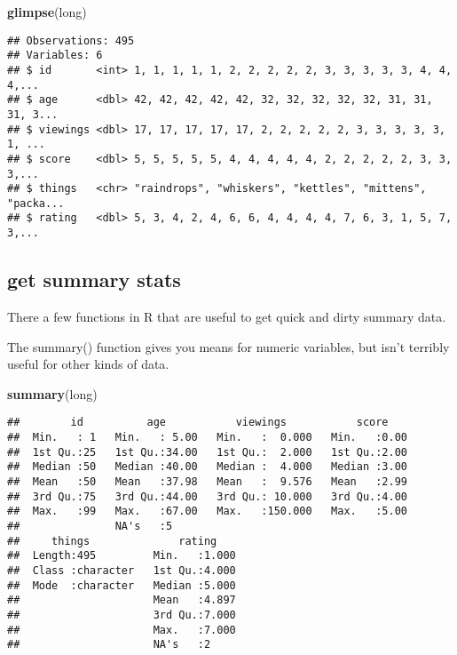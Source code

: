 \documentclass[]{article}
\newenvironment{Shaded}{\begin{snugshade}}{\end{snugshade}}
\newcommand{\KeywordTok}[1]{\textcolor[rgb]{0.13,0.29,0.53}{\textbf{#1}}}
\newcommand{\NormalTok}[1]{#1}
\begin{document}
\begin{Shaded}
\begin{Highlighting}[]
\KeywordTok{glimpse}\NormalTok{(long)}
\end{Highlighting}
\end{Shaded}

\begin{verbatim}
## Observations: 495
## Variables: 6
## $ id       <int> 1, 1, 1, 1, 1, 2, 2, 2, 2, 2, 3, 3, 3, 3, 3, 4, 4, 4,...
## $ age      <dbl> 42, 42, 42, 42, 42, 32, 32, 32, 32, 32, 31, 31, 31, 3...
## $ viewings <dbl> 17, 17, 17, 17, 17, 2, 2, 2, 2, 2, 3, 3, 3, 3, 3, 1, ...
## $ score    <dbl> 5, 5, 5, 5, 5, 4, 4, 4, 4, 4, 2, 2, 2, 2, 2, 3, 3, 3,...
## $ things   <chr> "raindrops", "whiskers", "kettles", "mittens", "packa...
## $ rating   <dbl> 5, 3, 4, 2, 4, 6, 6, 4, 4, 4, 4, 7, 6, 3, 1, 5, 7, 3,...
\end{verbatim}

\hypertarget{get-summary-stats}{%
\subsection{get summary stats}\label{get-summary-stats}}

There a few functions in R that are useful to get quick and dirty
summary data.

The summary() function gives you means for numeric variables, but isn't
terribly useful for other kinds of data.

\begin{Shaded}
\begin{Highlighting}[]
\KeywordTok{summary}\NormalTok{(long)}
\end{Highlighting}
\end{Shaded}

\begin{verbatim}
##        id          age           viewings           score     
##  Min.   : 1   Min.   : 5.00   Min.   :  0.000   Min.   :0.00  
##  1st Qu.:25   1st Qu.:34.00   1st Qu.:  2.000   1st Qu.:2.00  
##  Median :50   Median :40.00   Median :  4.000   Median :3.00  
##  Mean   :50   Mean   :37.98   Mean   :  9.576   Mean   :2.99  
##  3rd Qu.:75   3rd Qu.:44.00   3rd Qu.: 10.000   3rd Qu.:4.00  
##  Max.   :99   Max.   :67.00   Max.   :150.000   Max.   :5.00  
##               NA's   :5                                       
##     things              rating     
##  Length:495         Min.   :1.000  
##  Class :character   1st Qu.:4.000  
##  Mode  :character   Median :5.000  
##                     Mean   :4.897  
##                     3rd Qu.:7.000  
##                     Max.   :7.000  
##                     NA's   :2
\end{verbatim}
\end{document}

